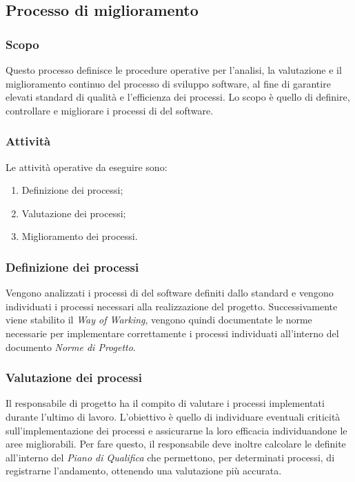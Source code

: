 \subsection{Processo di miglioramento} 
\label{subsec:miglioramento}

\subsubsection{Scopo}
Questo processo definisce le procedure operative per l'analisi, la valutazione e il miglioramento continuo del processo di sviluppo software, al fine di garantire elevati standard di qualità e l'efficienza dei processi.
Lo scopo è quello di definire, controllare e migliorare i processi di  del software.

\subsubsection{Attività}
Le attività operative da eseguire sono:
\begin{enumerate}
    \item Definizione dei processi;
    \item Valutazione dei processi;
    \item Miglioramento dei processi.
\end{enumerate}

\subsubsection{Definizione dei processi}
Vengono analizzati i processi di  del software definiti dallo standard  e vengono individuati
i processi necessari alla realizzazione del progetto.
Successivamente viene stabilito il \textit{Way of Warking}, vengono quindi documentate le norme necessarie per implementare correttamente
i processi individuati all'interno del documento \textit{Norme di Progetto}.

\subsubsection{Valutazione dei processi}
Il responsabile di progetto ha il compito di valutare i processi implementati durante l'ultimo  di lavoro.
L'obiettivo è quello di individuare eventuali criticità sull'implementazione dei processi e assicurarne la loro efficacia individuandone le aree migliorabili.
Per fare questo, il responsabile deve inoltre calcolare le  definite all'interno del \textit{Piano di Qualifica} che permettono, per determinati processi,
di registrarne l'andamento, ottenendo una valutazione più accurata.

